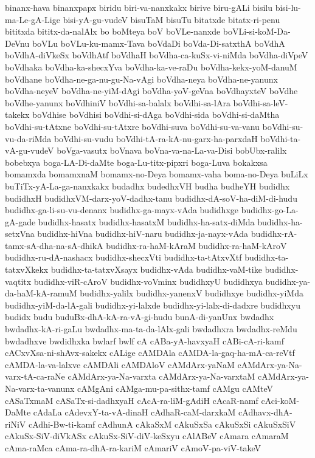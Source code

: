 {binanx-hava
binanxpapx
biridu
biri-va-nanxkakx
birive
biru-gALi
bisilu
bisi-lu-ma-Le-gA-Lige
bisi-yA-gu-vudeV
bisuTaM
bisuTu
bitatxde
bitatx-ri-penu
bititxda
bititx-da-nalAlx
bo
boMteya
boV
boVLe-nanxde
boVLi-si-koM-Da-DeVnu
boVLu
boVLu-ku-mamx-Tava
boVdaDi
boVda-Di-satxthA
boVdhA
boVdhA-diVkeSx
boVdhAtf
boVdhaH
boVdha-ca-kuSx-vi-niMda
boVdha-diVpeV
boVdhaka
boVdha-ka-shecxYva
boVdha-ka-ve-raDu
boVdha-kekx-yoM-danuM
boVdhane
boVdha-ne-ga-nu-gu-Na-vAgi
boVdha-neya
boVdha-ne-yanunx
boVdha-neyeV
boVdha-ne-yiM-dAgi
boVdha-yoV-geVna
boVdhayxteV
boVdhe
boVdhe-yanunx
boVdhiniV
boVdhi-sa-balalx
boVdhi-sa-lAra
boVdhi-sa-leV-takekx
boVdhise
boVdhisi
boVdhi-si-dAga
boVdhi-sida
boVdhi-si-daMtha
boVdhi-su-tAtxne
boVdhi-su-tAtxre
boVdhi-suva
boVdhi-su-va-vanu
boVdhi-su-vu-da-riMda
boVdhi-su-vudu
boVdhi-tA-ra-kA-nu-garx-ha-parxdaH
boVdhi-ta-vA-gu-vudeV
boVga-vasutx
boVnava
boVna-va-na-La-va-Disi
bobUbx-ralilx
bobebxya
boga-LA-Di-daMte
boga-Lu-titx-pipxri
boga-Luva
bokakxsa
bomamxda
bomamxnaM
bomamx-no-Deya
bomamx-vaha
boma-no-Deya
buLiLx
buTiTx-yA-La-ga-nanxkakx
budadhx
budedhxVH
budha
budheYH
budidhx
budidhxH
budidhxVM-darx-yoV-dadhx-tanu
budidhx-dA-soV-ha-diM-di-hudu
budidhx-ga-li-su-vu-denanx
budidhx-ga-mayx-vAda
budidhxge
budidhx-go-La-gA-gade
budidhx-hasatx
budidhx-hasatxM
budidhx-ha-satx-diMda
budidhx-ha-setxVna
budidhx-hiVna
budidhx-hiV-naru
budidhx-ja-nayx-vAda
budidhx-rA-tamx-sA-dha-na-sA-dhikA
budidhx-ra-haM-kAraM
budidhx-ra-haM-kAroV
budidhx-ru-dA-nashacx
budidhx-shecxVti
budidhx-ta-tAtxvXtf
budidhx-ta-tatxvXkekx
budidhx-ta-tatxvXsayx
budidhx-vAda
budidhx-vaM-tike
budidhx-vaqtitx
budidhx-viR-cAroV
budidhx-voVminx
budidhxyU
budidhxya
budidhx-ya-da-haM-kA-ramuM
budidhx-yalilx
budidhx-yanenxV
budidhxye
budidhx-yiMda
budidhx-yiM-da-lA-gali
budidhx-yi-lalxde
budidhx-yi-lalx-di-dadxre
budidhxyu
budidx
budu
buduBx-dhA-kA-ra-vA-gi-hudu
bunA-di-yanUnx
bwdadhx
bwdadhx-kA-ri-gaLu
bwdadhx-ma-ta-da-lAlx-gali
bwdadhxra
bwdadhx-reMdu
bwdadhxve
bwdidhxka
bwlarf
bwlf
cA
cABa-yA-havxyaH
cABi-cA-ri-kamf
cACxvXsa-ni-shAvx-sakekx
cALige
cAMDAla
cAMDA-la-gaq-ha-mA-ca-reVtf
cAMDA-la-va-lalxve
cAMDAli
cAMDAloV
cAMdArx-yaNaM
cAMdArx-ya-Na-varx-tA-ca-raNe
cAMdArx-ya-Na-varxta
cAMdArx-ya-Na-varxtaM
cAMdArx-ya-Na-varx-ta-vanunx
cAMgAni
cAMga-mu-pa-sithx-tamf
cAMgu
cAMteV
cASaTxmaM
cASaTx-si-dadhxyaH
cAcA-ra-liM-gAdiH
cAcaR-namf
cAci-koM-DaMte
cAdaLa
cAdevxY-ta-vA-dinaH
cAdhaR-caM-darxkaM
cAdhavx-dhA-riNiV
cAdhi-Bw-ti-kamf
cAdhunA
cAkaSxM
cAkuSxSa
cAkuSxSi
cAkuSxSiV
cAkuSx-SiV-diVkASx
cAkuSx-SiV-diV-keSxyu
cAlABeV
cAmara
cAmaraM
cAma-raMca
cAma-ra-dhA-ra-kariM
cAmariV
cAmoV-pa-viV-takeV
}
